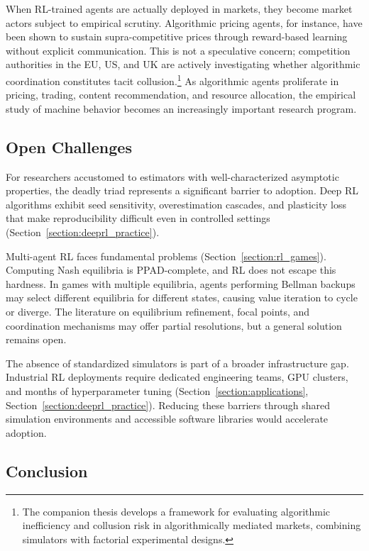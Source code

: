 When RL-trained agents are actually deployed in markets, they become market actors subject to empirical scrutiny. Algorithmic pricing agents, for instance, have been shown to sustain supra-competitive prices through reward-based learning without explicit communication. This is not a speculative concern; competition authorities in the EU, US, and UK are actively investigating whether algorithmic coordination constitutes tacit collusion.\footnote{The companion thesis \citep{Rawat2026collusion} develops a framework for evaluating algorithmic inefficiency and collusion risk in algorithmically mediated markets, combining simulators with factorial experimental designs.} As algorithmic agents proliferate in pricing, trading, content recommendation, and resource allocation, the empirical study of machine behavior becomes an increasingly important research program. 

\subsection{Open Challenges}

For researchers accustomed to estimators with well-characterized asymptotic properties, the deadly triad represents a significant barrier to adoption. Deep RL algorithms exhibit seed sensitivity, overestimation cascades, and plasticity loss that make reproducibility difficult even in controlled settings (Section~\ref{section:deeprl_practice}).

Multi-agent RL faces fundamental problems (Section~\ref{section:rl_games}). Computing Nash equilibria is PPAD-complete, and RL does not escape this hardness. In games with multiple equilibria, agents performing Bellman backups may select different equilibria for different states, causing value iteration to cycle or diverge. The literature on equilibrium refinement, focal points, and coordination mechanisms may offer partial resolutions, but a general solution remains open.

The absence of standardized simulators is part of a broader infrastructure gap. Industrial RL deployments require dedicated engineering teams, GPU clusters, and months of hyperparameter tuning (Section~\ref{section:applications}, Section~\ref{section:deeprl_practice}). Reducing these barriers through shared simulation environments and accessible software libraries would accelerate adoption.

\subsection{Conclusion}

